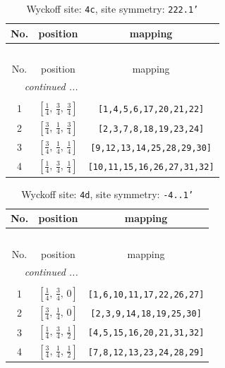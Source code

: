 \documentclass[fleqn,8pt]{jsarticle}
\begin{document}
\renewcommand{\arraystretch}{1.2}
\begin{longtable}{ccc}
\caption{Wyckoff site: {\tt 4c}, site symmetry: {\tt 222.1'}}
 \\
 \hline \hline
No. & position & mapping \\ \hline \endfirsthead

\multicolumn{2}{l}{\tablename\ \thetable{}} \\
 \hline \hline
No. & position & mapping \\ \hline \endhead

 \hline \hline
\multicolumn{2}{r}{\footnotesize\it continued ...} \\ \endfoot

 \hline \hline
\multicolumn{2}{r}{} \\ \endlastfoot

1 & $\left[ \frac{1}{4},\, \frac{3}{4},\, \frac{3}{4} \right]$ & {\tt [1,4,5,6,17,20,21,22]} \\ \hline
2 & $\left[ \frac{3}{4},\, \frac{1}{4},\, \frac{3}{4} \right]$ & {\tt [2,3,7,8,18,19,23,24]} \\ \hline
3 & $\left[ \frac{3}{4},\, \frac{1}{4},\, \frac{1}{4} \right]$ & {\tt [9,12,13,14,25,28,29,30]} \\ \hline
4 & $\left[ \frac{1}{4},\, \frac{3}{4},\, \frac{1}{4} \right]$ & {\tt [10,11,15,16,26,27,31,32]} \\
\end{longtable}
\renewcommand{\arraystretch}{1.2}
\begin{longtable}{ccc}
\caption{Wyckoff site: {\tt 4d}, site symmetry: {\tt -4..1'}}
 \\
 \hline \hline
No. & position & mapping \\ \hline \endfirsthead

\multicolumn{2}{l}{\tablename\ \thetable{}} \\
 \hline \hline
No. & position & mapping \\ \hline \endhead

 \hline \hline
\multicolumn{2}{r}{\footnotesize\it continued ...} \\ \endfoot

 \hline \hline
\multicolumn{2}{r}{} \\ \endlastfoot

1 & $\left[ \frac{1}{4},\, \frac{3}{4},\, 0 \right]$ & {\tt [1,6,10,11,17,22,26,27]} \\ \hline
2 & $\left[ \frac{3}{4},\, \frac{1}{4},\, 0 \right]$ & {\tt [2,3,9,14,18,19,25,30]} \\ \hline
3 & $\left[ \frac{1}{4},\, \frac{3}{4},\, \frac{1}{2} \right]$ & {\tt [4,5,15,16,20,21,31,32]} \\ \hline
4 & $\left[ \frac{3}{4},\, \frac{1}{4},\, \frac{1}{2} \right]$ & {\tt [7,8,12,13,23,24,28,29]} \\
\end{longtable}
\end{document}

